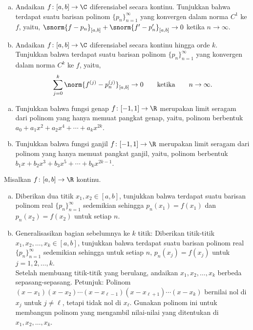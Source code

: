 \begin{exercise}
\pagebreak[2]
\leavevmode
\begin{enumerate}[a)]
\item
Andaikan $f \colon [a,b] \to \C$ diferensiabel secara kontinu.
Tunjukkan bahwa terdapat suatu barisan polinom
$\{ p_n \}_{n=1}^\infty$
yang konvergen dalam norma $C^1$ ke $f$, yaitu,
$\snorm{f - p_n}_{[a,b]} + \snorm{f'-p_n'}_{[a,b]} \to 0$ ketika $n \to \infty$.
\item
Andaikan $f \colon [a,b] \to \C$ diferensiabel secara kontinu hingga orde $k$.
Tunjukkan bahwa terdapat suatu barisan polinom
$\{ p_n \}_{n=1}^\infty$
yang konvergen dalam norma $C^k$ ke $f$, yaitu,
\begin{equation*}
\sum_{j=0}^k \norm{f^{(j)} - p_n^{(j)}}_{[a,b]} \to 0 \qquad \text{ketika} \qquad
n \to \infty.
\end{equation*}
\end{enumerate}
\end{exercise}

\begin{exercise}
\pagebreak[2]
\leavevmode
\begin{enumerate}[a)]
\item
Tunjukkan bahwa fungsi genap $f \colon [-1,1] \to \R$ merupakan limit seragam
dari polinom yang hanya memuat pangkat genap, yaitu, polinom
berbentuk $a_0 + a_1 x^2 + a_2 x^4 + \cdots + a_k x^{2k}$.
\item
Tunjukkan bahwa fungsi ganjil $f \colon [-1,1] \to \R$ merupakan limit seragam
dari polinom yang hanya memuat pangkat ganjil, yaitu, polinom
berbentuk $b_1 x + b_2 x^3 + b_3 x^5 + \cdots + b_k x^{2k-1}$.
\end{enumerate}
\end{exercise}

\begin{exercise} \label{exercise:finitelymanyweierequal}
\pagebreak[2]
Misalkan $f \colon [a,b] \to \R$ kontinu.
\begin{enumerate}[a)]
\item
Diberikan dua titik $x_1,x_2 \in [a,b]$, tunjukkan bahwa
terdapat suatu barisan polinom real $\{ p_n \}_{n=1}^\infty$
sedemikian sehingga $p_n(x_1) = f(x_1)$ dan $p_n(x_2) = f(x_2)$ untuk setiap $n$.
\item
Generalisasikan bagian sebelumnya ke $k$ titik:
Diberikan titik-titik $x_1,x_2,\ldots,x_k \in [a,b]$, tunjukkan bahwa
terdapat suatu barisan polinom real $\{ p_n \}_{n=1}^\infty$
sedemikian sehingga untuk setiap $n$, $p_n(x_j) = f(x_j)$ untuk $j=1,2,\ldots,k$.
\\
Setelah membuang titik-titik yang berulang, andaikan $x_1,x_2,\ldots,x_k$ berbeda sepasang-sepasang.
Petunjuk: Polinom $(x-x_1)(x-x_2)\cdots(x-x_{\ell-1})(x-x_{\ell+1})
\cdots(x-x_k)$ bernilai nol di $x_j$ untuk $j \neq \ell$, tetapi tidak nol di
$x_\ell$.  Gunakan polinom ini untuk membangun polinom yang mengambil nilai-nilai yang ditentukan
di $x_1,x_2,\ldots,x_k$.
\end{enumerate}
\end{exercise}

